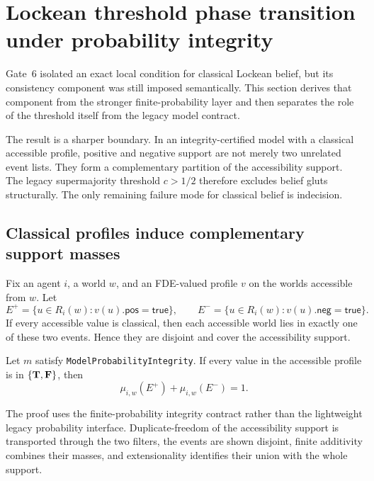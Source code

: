 \section{Lockean threshold phase transition under probability integrity}
\label{sec:lockean-threshold-phase}

Gate~6 isolated an exact local condition for classical Lockean belief, but its
consistency component was still imposed semantically.  This section derives that
component from the stronger finite-probability layer and then separates the role of
the threshold itself from the legacy model contract.

The result is a sharper boundary.  In an integrity-certified model with a classical
accessible profile, positive and negative support are not merely two unrelated event
lists.  They form a complementary partition of the accessibility support.  The
legacy supermajority threshold \(c>1/2\) therefore excludes belief gluts
structurally.  The only remaining failure mode for classical belief is indecision.

\subsection{Classical profiles induce complementary support masses}

Fix an agent \(i\), a world \(w\), and an FDE-valued profile \(v\) on the worlds
accessible from \(w\).  Let
\[
  E^+ = \{u\in R_i(w) : v(u).\mathsf{pos}=\mathsf{true}\},
  \qquad
  E^- = \{u\in R_i(w) : v(u).\mathsf{neg}=\mathsf{true}\}.
\]
If every accessible value is classical, then each accessible world lies in exactly
one of these two events.  Hence they are disjoint and cover the accessibility
support.

\begin{theorem}
\label{thm:classical-support-masses-sum-one}
Let \(m\) satisfy \texttt{ModelProbabilityIntegrity}.  If every value in the
accessible profile is in \(\{\mathbf{T},\mathbf{F}\}\), then
\[
  \mu_{i,w}(E^+) + \mu_{i,w}(E^-) = 1.
\]
\statusverified
\end{theorem}

The proof uses the finite-probability integrity contract rather than the lightweight
legacy probability interface.  Duplicate-freedom of the accessibility support is
transported through the two filters, the events are shown disjoint, finite
additivity combines their masses, and extensionality identifies their union with the
whole support.

